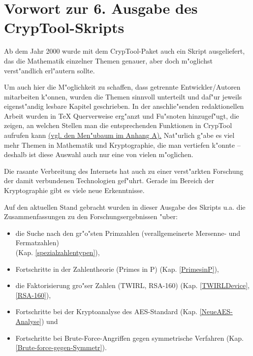 

\section*{Vorwort zur 6. Ausgabe des CrypTool-Skripts}  

Ab dem Jahr 2000 wurde mit dem CrypTool-Paket auch ein Skript 
ausgeliefert, das die Mathematik einzelner Themen genauer, aber doch 
m"oglichst verst"andlich erl"autern sollte.

Um auch hier die M"oglichkeit zu schaffen, dass getrennte Entwickler/Autoren
mitarbeiten k"onnen, wurden die Themen sinnvoll unterteilt und daf"ur jeweils
eigenst"andig lesbare Kapitel geschrieben. In der anschlie"senden redaktionellen
Arbeit wurden in TeX Querverweise erg"anzt und Fu"snoten hinzugef"ugt, die
zeigen, an welchen Stellen man die entsprechenden Funktionen in
CrypTool aufrufen kann 
\hyperlink{appendix-menutree}{(vgl. den Men"ubaum im Anhang A).}
Nat"urlich g"abe es viel mehr Themen in Mathematik und Kryptographie, die
man vertiefen k"onnte -- deshalb ist diese Auswahl auch nur eine von
vielen m"oglichen.

Die rasante Verbreitung des Internets hat auch zu einer verst"arkten 
Forschung der damit verbundenen Technologien gef"uhrt. Gerade im Bereich 
der Kryptographie gibt es viele neue Erkenntnisse.

Auf den aktuellen Stand gebracht wurden in dieser Ausgabe 
des Skripts u.a. die Zusammenfassungen zu den Forschungsergebnissen "uber:                   
\vspace{-7pt}
\begin{itemize}
  \item die Suche nach den gr"o"sten Primzahlen (verallgemeinerte
        Mersenne- und Fermatzahlen) \\ (Kap. \ref{spezialzahlentypen}),
  \item Fortschritte in der Zahlentheorie (\glqq Primes in P\grqq)
        (Kap. \ref{PrimesinP}),
  \item die Faktorisierung gro"ser Zahlen (TWIRL, RSA-160) 
        (Kap. \ref{TWIRLDevice}, \ref{RSA-160}),
  \item Fortschritte bei der Kryptoanalyse des AES-Standard 
        (Kap. \ref{NeueAES-Analyse}) und
  \item Fortschritte bei Brute-Force-Angriffen gegen symmetrische Verfahren
	(Kap. \ref{Brute-force-gegen-Symmetr}).
\end{itemize}

